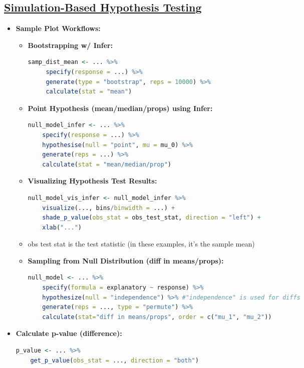 \documentclass[8pt,landscape,a4paper, fleqn, dvipsnames]{extarticle}
\begin{document}
\begin{multicols*}{4}
\section*{\ul{Simulation-Based Hypothesis Testing}}
\begin{itemize}
     \item \textbf{Sample Plot Workflows:}
    \begin{itemize}
        \item \textbf{Bootstrapping w/ Infer:}
        \begin{lstlisting}[language = R]
samp_dist_mean <- ... %>% 
     specify(response = ...) %>% 
     generate(type = "bootstrap", reps = 10000) %>% 
     calculate(stat = "mean")
        \end{lstlisting}
        \item \textbf{Point Hypothesis (mean/median/props) using Infer:}
        \begin{lstlisting}[language = R]
null_model_infer <- ... %>% 
    specify(response = ...) %>% 
    hypothesise(null = "point", mu = mu_0) %>% 
    generate(reps = ...) %>% 
    calculate(stat = "mean/median/prop")
        \end{lstlisting}
        \item \textbf{Visualizing Hypothesis Test Results:}
        \begin{lstlisting}[language = R]
null_model_vis_infer <- null_model_infer %>% 
    visualize(..., bins/binwidth = ...) + 
    shade_p_value(obs_stat = obs_test_stat, direction = "left") +
    xlab("...")
        \end{lstlisting}
        \item obs test stat is the test statistic (in these examples, it's the sample mean)
        \item \textbf{Sampling from Null Distribution (diff in means/props):}
        \begin{lstlisting}[language = R]
null_model <- ... %>% 
    specify(formula = explanatory ~ response) %>% 
    hypothesize(null = "independence") %>% #"independence" is used for diffs
    generate(reps = ..., type = "permute") %>% 
    calculate(stat="diff in means/props", order = c("mu_1", "mu_2"))    
        \end{lstlisting}
    \end{itemize}
    \item \textbf{Calculate p-value (difference):}
        \begin{lstlisting}[language = R]
p_value <- ... %>% 
    get_p_value(obs_stat = ..., direction = "both") 

\end{lstlisting}
\end{itemize}
\end{multicols*}
\end{document}
